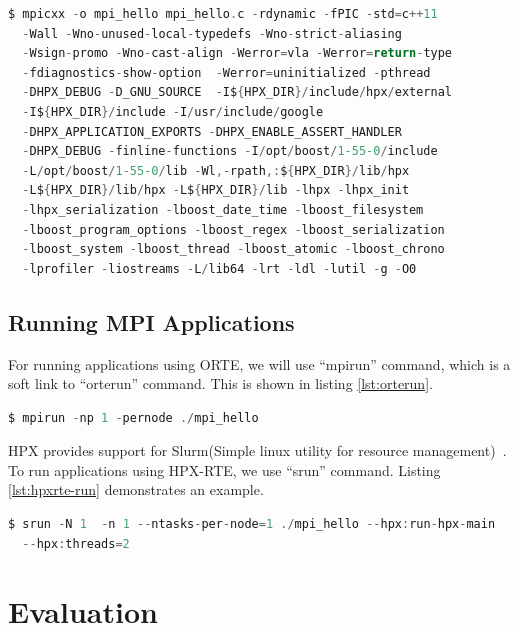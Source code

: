 \begin{lstlisting}[language=C, frame=single, basicstyle=\footnotesize, caption=Compile Line for Hello World\label{lst:compile}]
  $ mpicxx -o mpi_hello mpi_hello.c -rdynamic -fPIC -std=c++11
  -Wall -Wno-unused-local-typedefs -Wno-strict-aliasing
  -Wsign-promo -Wno-cast-align -Werror=vla -Werror=return-type
  -fdiagnostics-show-option  -Werror=uninitialized -pthread
  -DHPX_DEBUG -D_GNU_SOURCE  -I${HPX_DIR}/include/hpx/external
  -I${HPX_DIR}/include -I/usr/include/google
  -DHPX_APPLICATION_EXPORTS -DHPX_ENABLE_ASSERT_HANDLER
  -DHPX_DEBUG -finline-functions -I/opt/boost/1-55-0/include
  -L/opt/boost/1-55-0/lib -Wl,-rpath,:${HPX_DIR}/lib/hpx
  -L${HPX_DIR}/lib/hpx -L${HPX_DIR}/lib -lhpx -lhpx_init
  -lhpx_serialization -lboost_date_time -lboost_filesystem
  -lboost_program_options -lboost_regex -lboost_serialization
  -lboost_system -lboost_thread -lboost_atomic -lboost_chrono
  -lprofiler -liostreams -L/lib64 -lrt -ldl -lutil -g -O0
\end{lstlisting}

\subsection{Running MPI Applications}
\iffalse

For running applications using ORTE, we will use ``mpirun'' command, which is a soft link to ``orterun'' command. This is shown in listing \ref{lst:orterun}.

\begin{lstlisting}[language=C, frame=single, basicstyle=\footnotesize, caption=Running MPI Applications Using ORTE \label{lst:orterun}]
$ mpirun -np 1 -pernode ./mpi_hello
\end{lstlisting}

HPX provides support for Slurm(Simple linux utility for resource management)~\cite{yoo2003slurm}. To run applications using HPX-RTE, we use ``srun'' command. Listing \ref{lst:hpxrte-run} demonstrates an example.

\begin{lstlisting}[language=C, frame=single, basicstyle=\footnotesize, caption=Running MPI Applications Using HPX-RTE \label{lst:hpxrte-run}]
$ srun -N 1  -n 1 --ntasks-per-node=1 ./mpi_hello --hpx:run-hpx-main
  --hpx:threads=2
\end{lstlisting}


\section{Evaluation}

